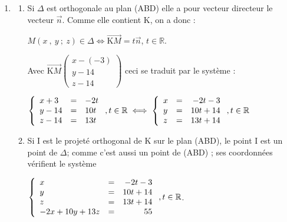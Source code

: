 \documentclass[10pt]{article}
\providecommand{\R}{\mathbb{R}}
\providecommand{\vect}[1]{\overrightarrow{#1}}
\begin{document}
\begin{enumerate}
\begin{enumerate}
$\vect{n} \cdot \vect{\text{AB}} = - 10 + 10 + 0 = 0$ et $\vect{n} \cdot \vect{\text{AD}} = 2 + 50 - 52 = 0$.

Conclusion : le vecteur $\vect{n}$, orthogonal à deux vecteurs non colinéaires du plan (ABD), est normal à ce plan.
		\item 
Le résultat précédent montre que le plan (ABD) a une équation de la forme\\
$-2x + 10y + 13z = d$, avec $d \in \R$.

Or par exemple $\text{B}(2~;~2~;~3) \in (\text{ABD})$ donc \\
$-2 \times 2  + 10 \times 2  + 13\times 3 = d \iff - 4 + 20 + 39 = d \iff d = 55$.

Donc le plan (ABD) a pour équation $ -2x + 10y + 13z = 55$.
	\end{enumerate}
	
\item
	\begin{enumerate}
		\item 
Si $\Delta$ est orthogonale au plan (ABD) elle a pour vecteur directeur le vecteur $\vect{n}$. Comme elle contient K, on a donc :

$M(x~,~y~;~z) \in \Delta \iff \vect{\text{K}M} = t\vect{n}$, \: $t \in \R$. 

Avec $\vect{\text{K}M}\begin{pmatrix}x - (-3)\\y - 14\\z - 14\end{pmatrix}$ ceci se traduit par le système :

$\left\{\begin{array}{l c l}
x + 3&=&- 2t\\
y - 14&=&10t\\
z - 14&=&13t
\end{array}\right., t \in \R \iff \left\{\begin{array}{l c r}
x &=&- 2t - 3\\
y &=&10t + 14\\
z &=&13t + 14
\end{array}\right., t \in \R $
		\item 
Si I est le projeté orthogonal de K sur le plan (ABD), le point I est un point de $\Delta$; comme c'est aussi un point de (ABD) ; ses coordonnées vérifient  le système

$\left\{\begin{array}{l c r}
x &=&- 2t - 3\\
y &=&10t + 14\\
z &=&13t + 14\\
- 2x + 10y + 13z &=& 55
\end{array}\right., t \in \R $.


\end{enumerate}
\end{enumerate}
\end{document}
